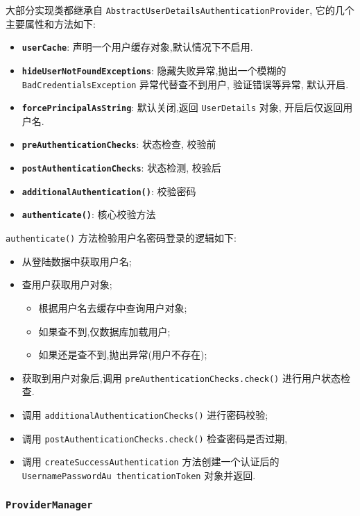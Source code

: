大部分实现类都继承自 \texttt{AbstractUserDetailsAuthenticationProvider}, 它的几个主要属性和方法如下:

\begin{itemize}
  \item \textbf{\texttt{userCache}}: 声明一个用户缓存对象,默认情况下不启用.
  \item \textbf{\texttt{hideUserNotFoundExceptions}}: 隐藏失败异常,抛出一个模糊的 \texttt{BadCredentialsException} 异常代替查不到用户, 验证错误等异常, 默认开启.
  \item \textbf{\texttt{forcePrincipalAsString}}: 默认关闭,返回 \texttt{UserDetails} 对象, 开启后仅返回用户名.
  \item \textbf{\texttt{preAuthenticationChecks}}: 状态检查, 校验前
  \item \textbf{\texttt{postAuthenticationChecks}}: 状态检测, 校验后
  \item \textbf{\texttt{additionalAuthentication()}}: 校验密码
  \item \textbf{\texttt{authenticate()}}: 核心校验方法
\end{itemize}

\texttt{authenticate()} 方法检验用户名密码登录的逻辑如下:
\begin{itemize}
  \item 从登陆数据中获取用户名;
  \item 查用户获取用户对象;
  \begin{itemize}
    \item 根据用户名去缓存中查询用户对象;
    \item 如果查不到,仅数据库加载用户;
    \item 如果还是查不到,抛出异常(用户不存在);
  \end{itemize}
  \item 获取到用户对象后,调用 \texttt{preAuthenticationChecks.check()} 进行用户状态检查.
  \item 调用 \texttt{additionalAuthenticationChecks()} 进行密码校验;
  \item 调用 \texttt{postAuthenticationChecks.check()} 检查密码是否过期,
  \item 调用 \texttt{createSuccessAuthentication} 方法创建一个认证后的 \texttt{UsernamePasswordAu thenticationToken} 对象并返回.
\end{itemize}

\subsubsection{\texttt{ProviderManager}}

